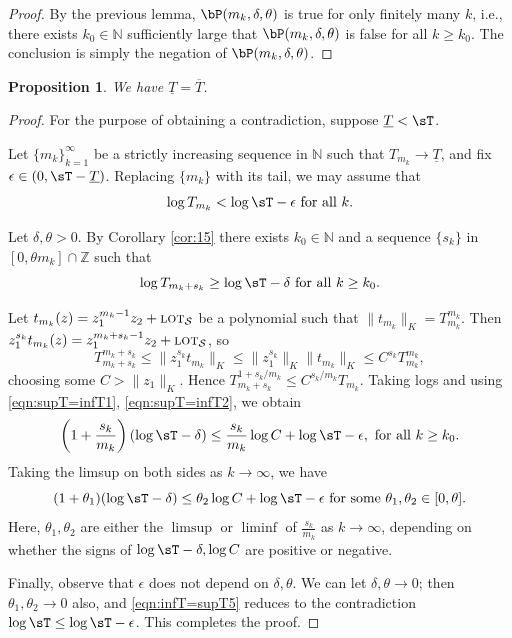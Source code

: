 \documentclass[12pt]{article}
\numberwithin{equation}{section}
\newtheorem{proposition}[theorem]{Proposition}
\newcommand{\Z}{\mathbb{Z}}
\newcommand{\N}{\mathbb{N}}
\newcommand{\lot}{\text{\sc lot}}
\newcommand{\calS}{\mathcal{S}}
\begin{document}
\begin{proof}
By the previous lemma, $\bP(m_k,\delta,\theta)$ is true for only finitely many $k$, i.e., there exists  $k_0\in \N$ sufficiently large that $\bP(m_k,\delta,\theta)$ is false for all $k\geq k_0$. The conclusion is simply the negation of $\bP(m_k,\delta,\theta)$. 
\end{proof}

\begin{proposition}\label{prop:infT=supT}
We have $\underline T=\overline T$.
\end{proposition}

\begin{proof} \def\uT{\underline T}
For the purpose of obtaining a contradiction, suppose $\uT<\sT$.  

Let $\{m_k\}_{k=1}^{\infty}$ be a strictly increasing sequence in $ \N$ such that $T_{m_k}\to\uT$, and fix $\epsilon\in(0,\sT-\uT)$.  Replacing $\{m_k\}$ with its tail, we may assume that 
\begin{equation}\label{eqn:supT=infT1}
\log T_{m_k}< \log\sT -\epsilon \hbox{ for all } k.
\end{equation}

Let $\delta,\theta>0$.  By Corollary \ref{cor:15} there exists $k_0\in \N$ and a sequence $\{s_k\}$ in $[0,\theta m_k]\cap \Z$ such that 
\begin{equation}\label{eqn:supT=infT2}
\log T_{m_k+s_k}\geq \log\sT -\delta \hbox{ for all } k\geq k_0.
\end{equation}

Let $t_{m_k}(z)=z_1^{m_k-1}z_2+\lot_{\calS}$ be a polynomial such that $\|t_{m_k}\|_K=T_{m_k}^{m_k}$.  Then $z_1^{s_k}t_{m_k}(z)=z_1^{m_k+s_k-1}z_2+\lot_{\calS}$, so 
$$
T_{m_k+s_k}^{m_k+s_k}\leq \|z_1^{s_k}t_{m_k}\|_K\leq \|z_1^{s_k}\|_K\|t_{m_k}\|_K\leq C^{s_k}T_{m_k}^{m_k},
$$
choosing some $C>\|z_1\|_K$.  Hence $T_{m_k+s_k}^{1+s_k/m_k}\leq C^{s_k/m_k}T_{m_k}$.  Taking logs and using \eqref{eqn:supT=infT1}, \eqref{eqn:supT=infT2}, we obtain 
$$
\left(1+\frac{s_k}{m_k}\right)(\log\sT -\delta)\leq  \frac{s_k}{m_k}\log C + \log\sT-\epsilon, \hbox{ for all }k\geq k_0.
$$
Taking the limsup on both sides as $k\to\infty$, we have 
\begin{equation}\label{eqn:infT=supT5}
(1+\theta_1)(\log\sT-\delta)\leq \theta_2\log C +\log\sT-\epsilon \hbox{ for some }\theta_1,\theta_2 \in[0,\theta].
\end{equation}
Here, $\theta_1,\theta_2$ are either the $\limsup$ or $\liminf$ of $\frac{s_k}{m_k}$ as $k\to\infty$, depending on whether the signs of  $\log\sT -\delta,\log C$ are positive or negative.

Finally, observe that $\epsilon$ does not depend on $\delta,\theta$.  We can let $\delta,\theta\to 0$; then $\theta_1,\theta_2\to 0$ also, and \eqref{eqn:infT=supT5} reduces to the contradiction $\log\sT\leq\log\sT-\epsilon$.  This completes the proof. 
\end{proof}
\end{document}
